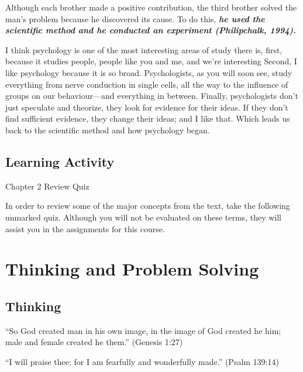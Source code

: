 \documentclass[
]{book}
\begin{document}
Although each brother made a positive contribution, the third brother solved the man's problem because he discovered its cause. To do this, \textbf{\emph{he used the scientific method and he conducted an experiment (Philipchalk, 1994).}}

I think psychology is one of the most interesting areas of study there is, first, because it studies people, people like you and me, and we're interesting Second, I like psychology because it is so broad. Psychologists, as you will soon see, study everything from nerve conduction in single cells, all the way to the influence of groups on our behaviour---and everything in between. Finally, psychologists don't just speculate and theorize, they look for evidence for their ideas. If they don't find sufficient evidence, they change their ideas; and I like that. Which leads us back to the scientific method and how psychology began.

\hypertarget{learning-activity}{%
\subsection*{Learning Activity}\label{learning-activity}}

\begin{reflect}
{Chapter 2 Review Quiz}

In order to review some of the major concepts from the text, take the following unmarked quiz. Although you will not be evaluated on these terms, they will assist you in the assignments for this course.
\end{reflect}

\hypertarget{thinking-and-problem-solving}{%
\section{Thinking and Problem Solving}\label{thinking-and-problem-solving}}

\hypertarget{thinking}{%
\subsection*{Thinking}\label{thinking}}

``So God created man in his own image, in the image of God created he him; male and female created he them.'' (Genesis 1:27)

``I will praise thee; for I am fearfully and wonderfully made.'' (Psalm 139:14)
\end{document}
